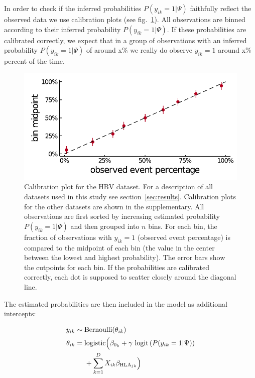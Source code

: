 \documentclass{bioinfo}
\begin{document}
\begin{methods}
In order to check if the inferred probabilities \(P(y_{ik}=1|\Psi)\) faithfully reflect the observed data we use calibration plots (see fig.~\ref{fig:phylogeny-calibration}). All observations are binned according to their inferred probability \(P(y_{ik}=1|\Psi)\). If these probabilities are calibrated correctly, we expect that in a group of observations with an inferred probability \(P(y_{ik}=1|\Psi)\) of around x\% we really do observe \(y_{ik}=1\) around x\% percent of the time.

\begin{figure}[!ht]
  \includegraphics[width=1\linewidth]{plots/phylogeny_calibration.pdf}
  \caption{Calibration plot for the HBV dataset. For a description of all datasets used in this study see section~\ref{sec:results}. Calibration plots for the other datasets are shown in the supplementary.
  All observations are first sorted by increasing estimated probability \(P(y_{ik}=1|\Psi)\) and then grouped into \(n\) bins.
  For each bin, the fraction of observations with \(y_{ik}=1\) (observed event percentage) is compared to the midpoint of each bin (the value in the center between the lowest and highest probability). The error bars show the cutpoints for each bin. If the probabilities are calibrated correctly, each dot is supposed to scatter closely around the diagonal line.}
  \label{fig:phylogeny-calibration}
\end{figure}

The estimated probabilities are then included in the model as additional intercepts:

\begin{equation}
\begin{aligned}
  y_{ik}  & \sim \text{Bernoulli}(\theta_{ik}) \\
  \theta_{ik}  & =  \text{logistic}\Bigl(\beta_{0_{k}} + \gamma~\text{logit}\left(P(y_{ik}=1|\Psi)\right) \\
  &\;\;\;\;\; + \sum_{k=1}^{D}X_{ik}\beta_{\text{HLA}_{jk}}\Bigr)
  \label{eq:phylogeny}
\end{aligned}
\end{equation}


\end{methods}
\end{document}
